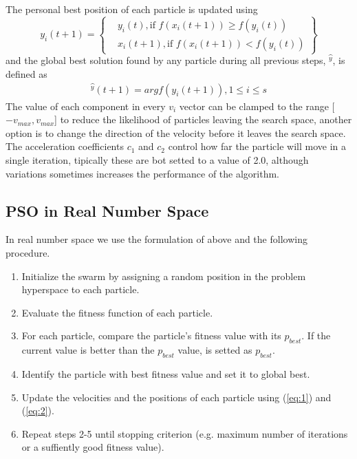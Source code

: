 \documentclass[journal]{IEEEtran}
\begin{document}
The personal best position of each particle is updated using
\begin{equation} \label{eq:3}
y_i(t+1) = \left\{
  \begin{aligned}
    &y_i(t), \text{if } f(x_i(t+1))\geq f(y_i(t)) \\
    &x_i(t+1), \text{if } f(x_i(t+1))<f(y_i(t))
  \end{aligned}
\right\}
\end{equation}
and the global best solution found by any particle during all previous steps, $\hat{^y}$, is defined as
\begin{equation} \label{eq:4}
    \begin{aligned}
        \hat{^y}(t+1)=arg f(y_i(t+1)), 1\leq i \leq s
    \end{aligned}
\end{equation}
The value of each component in every $v_i$ vector can be clamped to the range [$-v_{max},v_{max}$] to reduce the likelihood of particles leaving the search space, another option is to change the direction of the velocity before it leaves the search space. The acceleration coefficients $c_1$ and $c_2$ control how far the particle will move in a single iteration, tipically these are bot setted to a value of 2.0, although variations sometimes increases the performance of the algorithm.

\subsection{PSO in Real Number Space}
In real number space we use the formulation of above and the following procedure.
\begin{enumerate}
    \item Initialize the swarm by assigning a random position in the problem hyperspace to each particle.
    \item Evaluate the fitness function of each particle.
    \item For each particle, compare the particle's fitness value with its $p_{best}$. If the current value is better than the $p_{best}$ value, is setted as $p_{best}$.
    \item Identify the particle with best fitness value and set it to global best.
    \item Update the velocities and the positions of each particle using (\ref{eq:1}) and (\ref{eq:2}).
    \item Repeat steps 2-5 until stopping criterion (e.g. maximum number of iterations or a suffiently good fitness value).
\end{enumerate}
\end{document}
